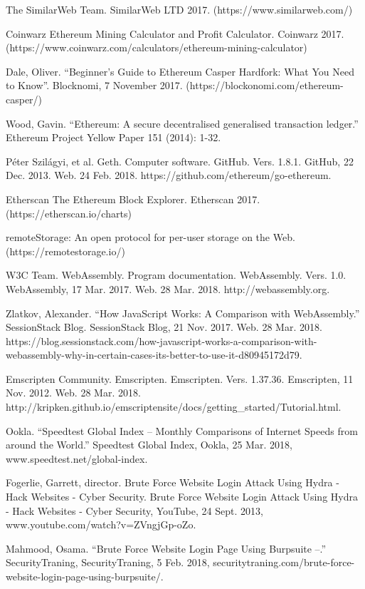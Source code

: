 \documentclass[runningheads]{llncs}
\begin{document}
\begin{thebibliography}{1}
 The SimilarWeb Team. SimilarWeb LTD 2017. (https://www.similarweb.com/)

Coinwarz Ethereum Mining Calculator and Profit Calculator. Coinwarz 2017. (https://www.coinwarz.com/calculators/ethereum-mining-calculator)

Dale, Oliver. ``Beginner's Guide to Ethereum Casper Hardfork: What You Need to Know''. Blocknomi, 7 November 2017. (https://blockonomi.com/ethereum-casper/)

Wood, Gavin. ``Ethereum: A secure decentralised generalised transaction ledger.'' Ethereum Project Yellow Paper 151 (2014): 1-32.

Péter Szilágyi, et al. Geth. Computer software. GitHub. Vers. 1.8.1. GitHub, 22 Dec. 2013. Web. 24 Feb. 2018. https://github.com/ethereum/go-ethereum. 

Etherscan The Ethereum Block Explorer. Etherscan 2017. (https://etherscan.io/charts)

 remoteStorage: An open protocol for per-user storage on the Web. (https://remotestorage.io/)

  W3C Team. WebAssembly. Program documentation. WebAssembly. Vers. 1.0. WebAssembly, 17 Mar. 2017. Web. 28 Mar. 2018. http://webassembly.org. 

 Zlatkov, Alexander. ``How JavaScript Works: A Comparison with WebAssembly.'' SessionStack Blog. SessionStack Blog, 21 Nov. 2017. Web. 28 Mar. 2018. https://blog.sessionstack.com/how-javascript-works-a-comparison-with-webassembly-why-in-certain-cases-its-better-to-use-it-d80945172d79. 

 Emscripten Community. Emscripten. Emscripten. Vers. 1.37.36. Emscripten, 11 Nov. 2012. Web. 28 Mar. 2018. http://kripken.github.io/emscripten\-site/docs/getting\_started/Tutorial.html. 

 Ookla. ``Speedtest Global Index – Monthly Comparisons of Internet Speeds from around the World.'' Speedtest Global Index, Ookla, 25 Mar. 2018, www.speedtest.net/global-index.

  Fogerlie, Garrett, director. Brute Force Website Login Attack Using Hydra - Hack Websites - Cyber Security. Brute Force Website Login Attack Using Hydra - Hack Websites - Cyber Security, YouTube, 24 Sept. 2013, www.youtube.com/watch?v=ZVngjGp-oZo. 

 Mahmood, Osama. ``Brute Force Website Login Page Using Burpsuite –.'' SecurityTraning, SecurityTraning, 5 Feb. 2018, securitytraning.com/brute-force-website-login-page-using-burpsuite/. 


\end{thebibliography}
\end{document}
